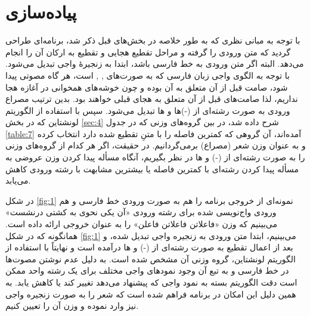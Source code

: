 \documentclass[12pt,onecolumn,a4paper]{article}
\begin{document}
    \section{پیاد‌ه‌سازی}
    با توجه به مبانی نظری که به طور خلاصه در بخش‌های قبل ذکر شد، برنامه‌ای طراحی گردید که متن ورودی را گرفته و مراحل تقطیع هجایی و تقطیع به ارکان آن را انجام می‌دهد. البته اگر متن ورودی به خط فارسی باشد، ابتدا به زنجیرۀ واجی تبدیل می‌شود. با توجه به الگوی واجی زبان فارسی که به صورت‌های , ,  است، هر گاه مصوتی پیدا شود، صامت قبل از آن متعلق به آن بوده و چون خوشه‌های همخوانی در آغازه هجا نداریم، لذا صامت‌های قبل از آن متعلق به هجای قبلی خواهند بود. بدین ترتیب مصراع ورودی به صورت رشته‌ای از (-)ها و ها تبدیل می‌شود. سپس با استفاده از الگوریتم لونشتاین که در بخش \ref{sec:4} شرح داده شد، در بین گروه‌های وزنی که در جدول \ref{table:7} آمده‌اند، آن گروهی که کمترین فاصله را با متنِ تقطیع شده دارد انتخاب کرده و به عنوان وزن شعر (مصراع) برمی‌گردانیم. در حقیقت، اگر هر کدام از گروه‌های وزنی را به صورت رشته‌ای از (-) و ها در نظر بگیریم، آنگاه مسأله پیدا کردن وزن عروضی به مسأله پیدا کردن رشته‌ای با کمترین فاصله یا بیشترین مشابهت با رشته ورودی کاهش می‌یابد.
    \par
    در شکل \ref{fig:1} نمونه‌ای از خروجی برنامه را هم به صورت ورودی خط فارسی و هم ورودی واج‌نویسی شده برای رشته ورودی «آن یکی نحوی به کشتی درنشست» می‌بینیم که وزن «فاعلاتن فاعلاتن فاعلن» را به عنوان خروجی ارائه داده است. همانگونه که در شکل \ref{fig:1} می‌بینیم، ابتدا متن ورودی به زنجیره واجی تبدیل شده، و بعد از اعمال تقطیع به صورت رشته‌ای از (-) و ها درآمده است و نهایتاً با استفاده از الگوریتم لونشتاین، گروه وزنی آن مشخص شده است. به دلیل عدم نوشتن مصوت‌ها در خط فارسی و به تبع آن وجود نمودهای واجی مختلف برای یک رشته واحد ممکن است دقت الگوریتم بسته به نمود واجی که پیشنهاد می‌دهد تغییر کند یا کاهش یابد. به همین دلیل این امکان در برنامه فراهم شده است که شعر را به صورت زنجیره واجی نیز وارد نموده و وزن آن را تعیین کنیم.
\end{document}
